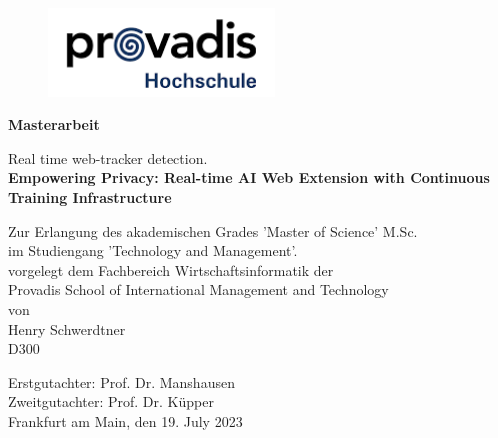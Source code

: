 \begin{titlepage}
	\strut
	\begin{center}
	\begin{figure}
  \begin{center}
	\includegraphics[width=6cm]{./images/provadis.png}
  \end{center}
	\end{figure}
			\large 
			\textbf{Masterarbeit}
		
		\vspace{0.5cm}
		\Huge
		\begin{spacing}{.9}
			Real time web-tracker detection.\\
			\vspace{0.5cm}
			\large
			\textbf{Empowering Privacy: Real-time AI Web Extension with Continuous Training Infrastructure} \\
		\end{spacing}
		\vspace{3cm}
		\small 
	    Zur Erlangung des akademischen Grades 'Master of Science' M.Sc. \\
      im Studiengang 'Technology and Management'. \\
		\vspace{0.7cm}
		\small
			vorgelegt dem Fachbereich Wirtschaftsinformatik der \\
		Provadis School of International Management and Technology \\
		von \\
		\vspace{0.7cm}
		Henry Schwerdtner\\
		\vspace{0.1cm}
		D300\\
		\vspace{1cm}
	 	\end{center}
		\begin{flushleft}
		Erstgutachter: \hspace{1.26cm} Prof. Dr. Manshausen \\
    Zweitgutachter: \hspace{1cm} Prof. Dr. Küpper \\
		\vspace{1.5cm}
		Frankfurt am Main, den 19. July 2023
		\end{flushleft}
\end{titlepage}

\shipout\null
